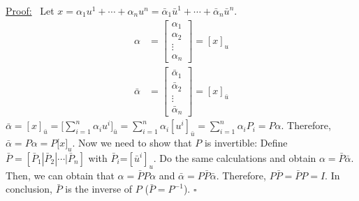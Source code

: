 \documentclass[letterpaper]{article}
\begin{document}
\noindent \underline{Proof:}~ Let $x=\alpha_1u^1+\dotsb+\alpha_nu^n=\bar{\alpha}_1\bar{u}^1+\dotsb+\bar{\alpha}_n\bar{u}^n$.
    \begin{align*}
        \alpha&=\begin{bmatrix}\alpha_{1}\\
            \alpha_{2}\\
            \vdots\\
            \alpha_{n}
        \end{bmatrix}=[x]_{u}\\
        \bar{\alpha}&=\begin{bmatrix}\bar{\alpha}_{1}\\
            \bar{\alpha}_{2}\\
            \vdots\\
            \bar{\alpha}_{n}
        \end{bmatrix}=[x]_{\bar{u}}
    \end{align*}
    $\bar{\alpha}=[x]_{\bar{u}}=\Big[ \displaystyle\sum_{i=1}^{n}\alpha_{i}u^{i}\Big]_{\bar{u}}=\displaystyle\sum_{i=1}^{n}\alpha_{i}[u^{i}]_{\bar{u}}=\displaystyle\sum_{i=1}^{n}\alpha_{i} P_{i}=P\alpha$.
    \newline
    Therefore, $\bar{\alpha} = P\alpha = P{[}x{]}_{u}$.
    \newline\newline
    Now we need to show that $P$ is invertible:
    \newline
    Define $\bar{P} = [\bar{P}_{1}|\bar{P}_{2}| \dotsb  |\bar{P}_{n}]$ with $\bar{P}_{i}$=$[\bar{u}^{i}]_{u}$.
    \newline
    Do the same calculations and obtain $\alpha=\bar{P}\bar{\alpha}$.
    \newline
    Then, we can obtain that $\alpha=\bar{P}P\alpha$ and $\bar{\alpha}=P\bar{P}\bar{\alpha}$.
    \newline
    Therefore, $P\bar{P} = \bar{P}P = I$.
    \newline
    In conclusion, $\bar{P}$ is the inverse of $P$ ($ \bar{P}=P^{-1}$). $\square$
\end{document}
